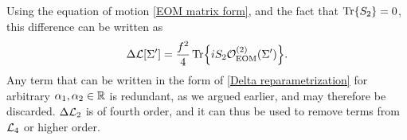 Using the equation of motion \autoref{EOM matrix form}, and the fact that $\Tr{S_2} = 0$, this difference can be written as
\begin{align}
    \label{Delta reparametrization}
    \Delta \mathcal{L}[\Sigma'] = \frac{f^2}{4} \Tr{i S_2 \mathcal{O}_\mathrm{EOM}^{(2)}(\Sigma')}.
\end{align}
Any term that can be written in the form of \autoref{Delta reparametrization} for arbitrary $\alpha_1, \alpha_2 \in \mathbb{R}$ is redundant, as we argued earlier, and may therefore be discarded.
$\Delta \mathcal{L}_2$ is of fourth order, and it can thus be used to remove terms from $\mathcal{L}_4$ or higher order.
